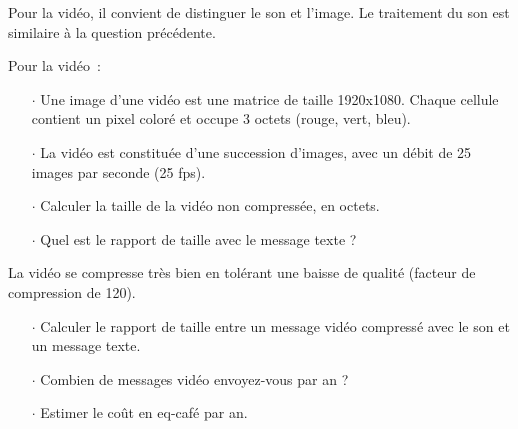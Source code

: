 




Pour la vidéo, il convient de distinguer le son et l'image. Le traitement du son est similaire à la question précédente.

Pour la vidéo~:

\begin{itemize}
\item[$\cdot$] Une image d'une vidéo est une matrice de taille 1920x1080. Chaque cellule contient un pixel coloré et occupe 3 octets (rouge, vert, bleu).
\item[$\cdot$] La vidéo est constituée d'une succession d'images, avec un débit de 25 images par seconde (25 fps).
\item[$\cdot$] Calculer la taille de la vidéo non compressée, en octets.
\item[$\cdot$] Quel est le rapport de taille avec le message texte ?
\end{itemize}

La vidéo se compresse très bien en tolérant une baisse de qualité  (facteur de compression de 120).
\begin{itemize}
\item[$\cdot$] Calculer le rapport de taille entre un message vidéo compressé avec le son et un message texte.
\item[$\cdot$] Combien de messages vidéo envoyez-vous par an ?
\item[$\cdot$] Estimer le coût en eq-café par an.
\end{itemize}

